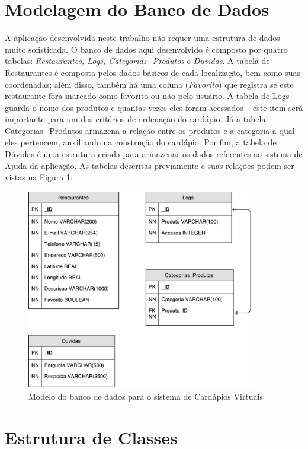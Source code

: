 \section{Modelagem do Banco de Dados}

A aplicação desenvolvida neste trabalho não requer uma estrutura de dados muito sofisticada. O banco de dados aqui desenvolvido é composto por quatro tabelas: \emph{Restaurantes, Logs, Categorias\_Produtos} e \emph{Duvidas}. A tabela de Restaurantes é composta pelos dados básicos de cada localização, bem como suas coordenadas; além disso, também há uma coluna (\emph{Favorito}) que registra se este restaurante fora marcado como favorito ou não pelo usuário. A tabela de Logs guarda o nome dos produtos e quantas vezes eles foram acessados -- este item será importante para um dos critérios de ordenação do cardápio. Já a tabela Categorias\_Produtos armazena a relação entre os produtos e a categoria a qual eles pertencem, auxiliando na construção do cardápio. Por fim, a tabela de Dúvidas é uma estrutura criada para armazenar os dados referentes ao sistema de Ajuda da aplicação. As tabelas descritas previamente e suas relações podem ser vistas na Figura \ref{fig:bd}:

\begin{figure}[H]
	\centering
	\caption[Modelagem do Banco de Dados]{\label{fig:bd}Modelo do banco de dados para o sistema de Cardápios Virtuais}
	\includegraphics[width=0.9\textwidth]{./pdf/bd.pdf}
\end{figure}

\section{Estrutura de Classes}

